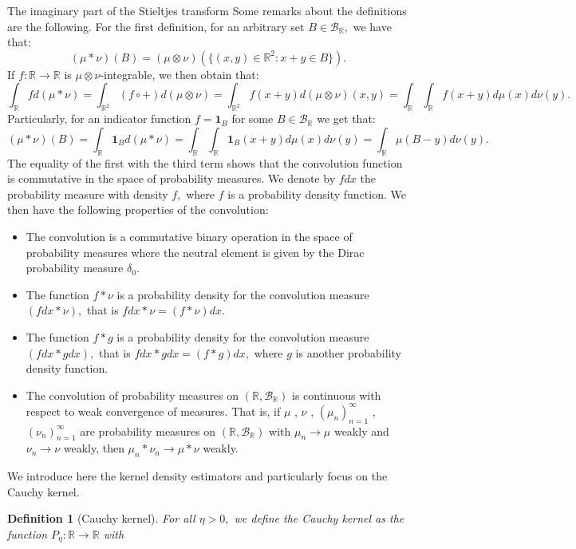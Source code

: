 \documentclass[11pt, a4paper, oneside]{book}
\numberwithin{equation}{chapter}
\newtheorem{definition}{Definition}[section]
\begin{document}
\begin{section}{The imaginary part of the Stieltjes transform}
Some remarks about the definitions are the following. For the first definition, for an arbitrary set $B \in \mathcal{B}_{\mathbb{R}},$ we have that:
\[
(\mu \ast \nu)(B) = (\mu \otimes \nu)(\{(x,y) \in \mathbb{R}^2: x+y \in B \}).
\]
%
If $f: \mathbb{R} \to \mathbb{R}$ is $\mu \otimes \nu$-integrable, we then obtain that:
%
\[
\int_{\mathbb{R}} f d(\mu \ast \nu) = \int_{\mathbb{R}^2} (f \circ +) d (\mu \otimes \nu) = \int_{\mathbb{R}^2} f(x+y) d(\mu \otimes \nu) (x,y) = \int_{\mathbb{R}} \int_{\mathbb{R}} f(x+y) d\mu(x) d\nu(y).
\]
%
Particularly, for an indicator function $f= \mathbf{1}_B$ for some $B \in \mathcal{B}_{\mathbb{R}}$ we get that:
\[
(\mu \ast \nu)(B) = \int_{\mathbb{R}} \mathbf{1}_{B} d(\mu \ast \nu) = \int_{\mathbb{R}} \int_{\mathbb{R}} \mathbf{1}_B (x+y) d\mu(x) d\nu(y) = \int_{\mathbb{R}} \mu(B - y) d\nu(y).
\]
The equality of the first with the third term shows that the convolution function is commutative in the space of probability measures. We denote by $f dx$ the probability measure with density $f,$ where $f$ is a probability density function. We then have the following properties of the convolution:
%
\begin{itemize}
    \item The convolution is a commutative binary operation in the space of probability measures where the neutral element is given by the Dirac probability measure $\delta_0.$
    \item The function $f \ast \nu$ is a probability density for the convolution measure $(f dx \ast \nu),$ that is $fdx \ast \nu = (f \ast \nu ) dx .$
    \item The function $f \ast g$ is a probability density for the convolution measure $(f dx \ast g dx),$ that is $f dx \ast g dx = (f \ast g) dx,$ where $g$ is another probability density function.
    \item The convolution of probability measures on $(\mathbb{R},\mathcal{B}_{\mathbb{R}})$ is continuous with respect to weak convergence of measures. That is, if $\mu$ , $\nu$ , $(\mu_n)_{n=1}^\infty$ , $(\nu_n)_{n=1}^\infty $ are probability measures on $(\mathbb{R},\mathcal{B}_{\mathbb{R}})$ with $\mu_n \to \mu$ weakly and $\nu_n \to \nu$ weakly, then $\mu_n \ast \nu_n \to \mu \ast \nu $ weakly.
\end{itemize}
%
We introduce here the kernel density estimators and particularly focus on the Cauchy kernel.
%
\begin{definition}[Cauchy kernel]
For all $\eta>0,$ we define the Cauchy kernel as the function $P_\eta : \mathbb{R} \to \mathbb{R}$ with

\end{definition}
\end{section}
\end{document}
